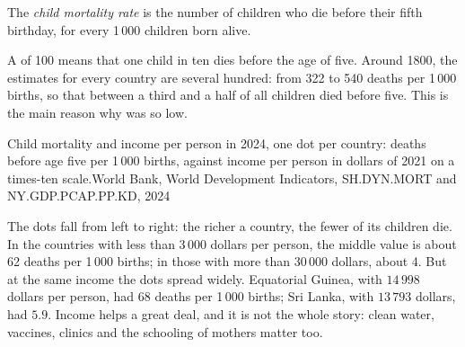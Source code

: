 \begin{definition}\label{def:g6:health-and-population:child-mortality}
The \emph{child mortality rate} is the number of
children who die before their fifth birthday, for every 1\,000 children born
alive.
\end{definition}

A  of 100 means that one child in ten dies before the age
of five. Around 1800, the estimates for every country are several hundred:
from 322 to 540 deaths per 1\,000 births, so that between a third and a half of
all children died before five.
This is the main reason why  was so low.

\begin{omchart}{Child mortality and income per person in 2024, one dot per
country: deaths before age five per 1\,000 births, against income per person in
dollars of 2021 on a times-ten scale.}{World Bank, World Development Indicators,
SH.DYN.MORT and NY.GDP.PCAP.PP.KD, 2024}
\end{omchart}

The dots fall from left to right: the richer a country, the fewer of its children
die. In the countries with less than 3\,000 dollars per person, the middle
value is about 62 deaths per 1\,000 births; in those with more than 30\,000
dollars, about 4. But at the same income the dots spread widely. Equatorial
Guinea, with $14\,998$ dollars per person, had 68 deaths per 1\,000 births; Sri
Lanka, with $13\,793$ dollars, had $5.9$. Income helps a great deal, and it is
not the whole story: clean water, vaccines, clinics and the schooling of mothers
matter too.

